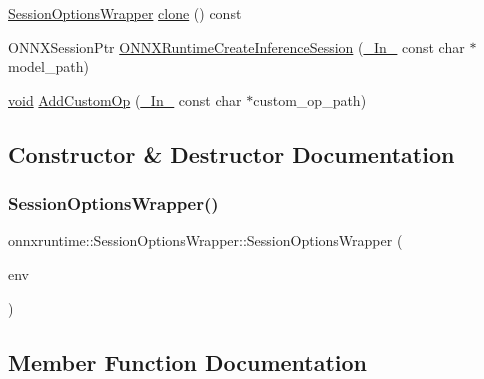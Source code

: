 \begin{DoxyCompactItemize}
\item 
\mbox{\hyperlink{classonnxruntime_1_1SessionOptionsWrapper}{Session\+Options\+Wrapper}} \mbox{\hyperlink{classonnxruntime_1_1SessionOptionsWrapper_aa68ff04f59b19e76b899e6e63c6bff27}{clone}} () const
\item 
O\+N\+N\+X\+Session\+Ptr \mbox{\hyperlink{classonnxruntime_1_1SessionOptionsWrapper_a1c3a0aa13d30416af7278f6e23a646d6}{O\+N\+N\+X\+Runtime\+Create\+Inference\+Session}} (\mbox{\hyperlink{visibility__macros_8h_aa74f89aa7d942f4a79ea12d7c9b763ef}{\+\_\+\+In\+\_\+}} const char $\ast$model\+\_\+path)
\item 
\mbox{\hyperlink{mlasi_8h_a88f941d423cb2a819b70a1358982b1a6}{void}} \mbox{\hyperlink{classonnxruntime_1_1SessionOptionsWrapper_afc53b9cc76ce0c5f2c0d98279f1cd744}{Add\+Custom\+Op}} (\mbox{\hyperlink{visibility__macros_8h_aa74f89aa7d942f4a79ea12d7c9b763ef}{\+\_\+\+In\+\_\+}} const char $\ast$custom\+\_\+op\+\_\+path)
\end{DoxyCompactItemize}


\subsection{Constructor \& Destructor Documentation}
\mbox{\label{classonnxruntime_1_1SessionOptionsWrapper_a3a057f59b41aad65ab884e404c1d1645}} 
\subsubsection{\texorpdfstring{Session\+Options\+Wrapper()}{SessionOptionsWrapper()}}
{\footnotesize\ttfamily onnxruntime\+::\+Session\+Options\+Wrapper\+::\+Session\+Options\+Wrapper (\begin{DoxyParamCaption}\item[{\mbox{\hyperlink{visibility__macros_8h_aa74f89aa7d942f4a79ea12d7c9b763ef}{\+\_\+\+In\+\_\+}} O\+N\+N\+X\+Env\+Ptr}]{env }\end{DoxyParamCaption})\hspace{0.3cm}{\ttfamily [inline]}}



\subsection{Member Function Documentation}
\mbox{\label{classonnxruntime_1_1SessionOptionsWrapper_afc53b9cc76ce0c5f2c0d98279f1cd744}} 
